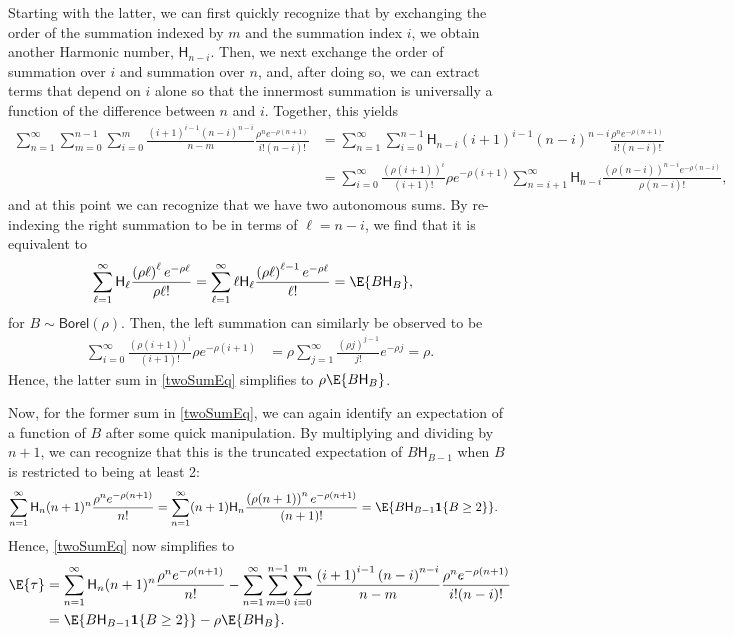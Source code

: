 Starting with the latter, we can first quickly recognize that by exchanging the order of the summation indexed by $m$ and the summation index $i$, we obtain another Harmonic number, $\mathsf{H}_{n-i}$. Then, we next exchange the order of summation over $i$ and summation over $n$, and, after doing so, we can extract terms that depend on $i$ alone so that the innermost summation is universally a function of the difference between $n$ and $i$. Together, this yields
\begin{align}
\sum_{n=1}^\infty
\sum_{m=0}^{n-1}
\sum_{i=0}^m
\frac{\left({i+1}\right)^{i-1}
\left({n-i}\right)^{n-i}}{n-m}
 \frac{\rho^n e^{-\rho(n+1)}}{i!(n-i)!}
 &=
 \sum_{n=1}^\infty
\sum_{i=0}^{n-1}
\mathsf{H}_{n-i}
\left({i+1}\right)^{i-1}
\left({n-i}\right)^{n-i}
 \frac{\rho^n e^{-\rho(n+1)}}{i!(n-i)!}
 \\
  &=
 \sum_{i=0}^\infty
 \frac{\left(\rho({i+1})\right)^{i} }{(i+1)!}
 \rho e^{-\rho(i+1)}
\sum_{n=i+1}^{\infty}
\mathsf{H}_{n-i}
 \frac{\left(\rho(n-i)\right)^{n-i} e^{-\rho(n-i)}}{\rho(n-i)!}
 ,
\end{align}
and at this point we can recognize that we have two autonomous sums. By re-indexing the right summation to be in terms of $\ell = n - i$, we find that it is equivalent to
\begin{align}
\sum_{\ell=1}^{\infty}
\mathsf{H}_{\ell}
 \frac{\left(\rho\ell\right)^{\ell} e^{-\rho\ell}}{\rho \ell!}
 &=
 \sum_{\ell=1}^{\infty}
\ell \mathsf{H}_{\ell}
 \frac{\left(\rho\ell\right)^{\ell-1} e^{-\rho\ell}}{ \ell!}
 =
 \E{B \mathsf{H}_B}
 ,
\end{align}
for $B \sim \mathsf{Borel}(\rho)$. Then, the left summation can similarly be observed to be 
\begin{align}
 \sum_{i=0}^\infty
 \frac{\left(\rho({i+1})\right)^{i} }{(i+1)!}
 \rho e^{-\rho(i+1)}
 &=
 \rho
  \sum_{j=1}^\infty
 \frac{\left(\rho j\right)^{j-1} }{j!}
 e^{-\rho j}
 =
 \rho
 .
\end{align}
Hence, the latter sum in \eqref{twoSumEq} simplifies to $\rho \E{B \mathsf{H}_B}$.

Now, for the former sum in \eqref{twoSumEq}, we can again identify an expectation of a function of $B$ after some quick manipulation. By multiplying and dividing by $n+1$, we can recognize that this is the truncated expectation of $B \mathsf{H}_{B-1}$ when $B$ is restricted to being at least 2:
\begin{align}
\sum_{n=1}^\infty 
\mathsf{H}_n (n+1)^{n} \frac{\rho^n e^{-\rho(n+1)}}{n!}
&=
\sum_{n=1}^\infty 
(n+1)\mathsf{H}_n  \frac{\left(\rho(n+1)\right)^n e^{-\rho(n+1)}}{(n+1)!}
=
\E{B \mathsf{H}_{B-1} \mathbf{1}\{B \geq 2\}}
.
\end{align}
Hence, \eqref{twoSumEq} now simplifies to
\begin{align}
\E{\tau}
&=
\sum_{n=1}^\infty 
\mathsf{H}_n (n+1)^{n} \frac{\rho^n e^{-\rho(n+1)}}{n!}
-
\sum_{n=1}^\infty
\sum_{m=0}^{n-1}
\sum_{i=0}^m
\frac{\left({i+1}\right)^{i-1}
\left({n-i}\right)^{n-i}}{n-m}
 \frac{\rho^n e^{-\rho(n+1)}}{i!(n-i)!}
\\
&=
\E{B \mathsf{H}_{B-1} \mathbf{1}\{B \geq 2\}}
-
\rho \E{B \mathsf{H}_{B}}
.
\end{align}

